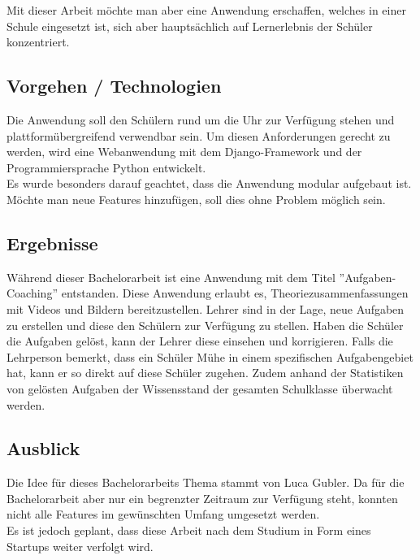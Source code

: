 Mit dieser Arbeit möchte man aber eine Anwendung erschaffen, welches in einer Schule eingesetzt ist, sich aber hauptsächlich auf Lernerlebnis der Schüler konzentriert. 



\subsection{Vorgehen / Technologien}
Die Anwendung soll den Schülern rund um die Uhr zur Verfügung stehen und plattformübergreifend verwendbar sein. Um diesen Anforderungen gerecht zu werden, wird eine Webanwendung mit dem Django-Framework und der Programmiersprache Python entwickelt. \\
Es wurde besonders darauf geachtet, dass die Anwendung modular aufgebaut ist. Möchte man neue Features hinzufügen, soll dies ohne Problem möglich sein.

\subsection{Ergebnisse}
Während dieser Bachelorarbeit ist eine Anwendung mit dem Titel ''Aufgaben-Coaching'' entstanden. Diese Anwendung erlaubt es, Theoriezusammenfassungen mit Videos und Bildern bereitzustellen. Lehrer sind in der Lage, neue Aufgaben zu erstellen und diese den Schülern zur Verfügung zu stellen. Haben die Schüler die Aufgaben gelöst, kann der Lehrer diese einsehen und korrigieren. Falls die Lehrperson bemerkt, dass ein Schüler Mühe in einem spezifischen Aufgabengebiet hat, kann er so direkt auf diese Schüler zugehen. Zudem anhand der Statistiken von gelösten Aufgaben der Wissensstand der gesamten Schulklasse überwacht werden.

\subsection{Ausblick}
Die Idee für dieses Bachelorarbeits Thema stammt von Luca Gubler. Da für die Bachelorarbeit aber nur ein begrenzter Zeitraum zur Verfügung steht, konnten nicht alle Features im gewünschten Umfang umgesetzt werden. \\

Es ist jedoch geplant, dass diese Arbeit nach dem Studium in Form eines Startups weiter verfolgt wird.


\newpage